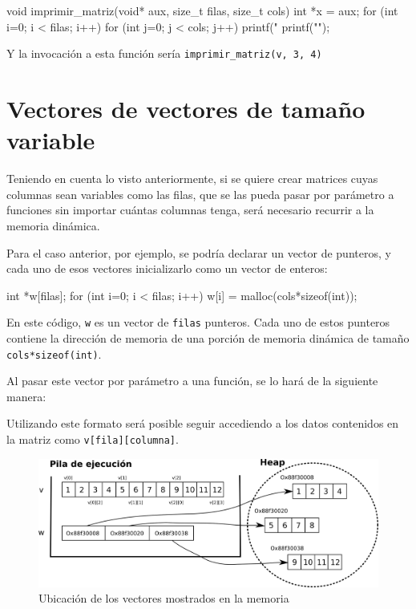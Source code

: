 \begin{codigo-c}
void imprimir_matriz(void* aux, size_t filas, size_t cols)
{
	int *x = aux;
    for (int i=0; i < filas; i++) {
        for (int j=0; j < cols; j++) {
            printf("%
        }
        printf("\n");
    }
}
\end{codigo-c}

Y la invocación a esta función sería \lstinline!imprimir_matriz(v, 3, 4)!

\section{Vectores de vectores de tamaño variable}

Teniendo en cuenta lo visto anteriormente, si se quiere crear matrices
cuyas columnas sean variables como las filas, que se las pueda pasar por
parámetro a funciones sin importar cuántas columnas tenga, será necesario
recurrir a la memoria dinámica.

Para el caso anterior, por ejemplo, se podría declarar un vector de
punteros, y cada uno de esos vectores inicializarlo como un vector de
enteros:

\begin{codigo-c-plano}
    int *w[filas];
    for (int i=0; i < filas; i++) {
        w[i] = malloc(cols*sizeof(int));
    }
\end{codigo-c-plano}

En este código, \lstinline!w! es un vector de \lstinline!filas! punteros.
Cada uno de estos punteros contiene la dirección de memoria de una porción
de memoria dinámica de tamaño \lstinline!cols*sizeof(int)!.

Al pasar este vector por parámetro a una función, se lo hará de la
siguiente manera:

\begin{codigo-c-plano}
void imprimir_matriz(int** v, size_t filas, size_t cols) {
\end{codigo-c-plano}

Utilizando este formato será posible seguir accediendo a los datos
contenidos en la matriz como \lstinline!v[fila][columna]!.

\begin{figure}[htb] 
\centering
\includegraphics{imagenes/vectores-matrices}
\caption{Ubicación de los vectores mostrados en la memoria}
\end{figure}

